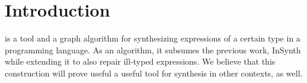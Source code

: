 \section{Introduction}
\ourTool is a tool and a graph algorithm for synthesizing expressions of a certain type in a programming language. As an algorithm, it subsumes the previous work, InSynth \citep{InSynth} while extending it to also repair ill-typed expressions. We believe that this construction will prove useful a useful tool for synthesis in other contexts, as well.